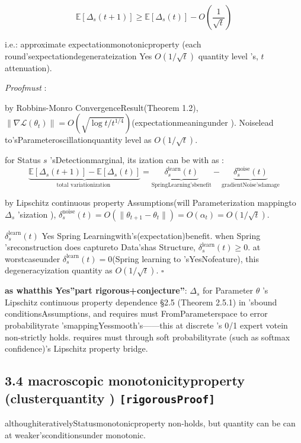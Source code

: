 \documentclass[
  12pt,
]{article}
\begin{document}
\[\boxed{\mathbb{E}[\Delta_s(t+1)] \geq \mathbb{E}[\Delta_s(t)] - O\left(\frac{1}{\sqrt{t}}\right)}\]

i.e.: approximate expectationmonotonicproperty (each round'sexpectationdegenerateization Yes \(O(1/\sqrt{t})\) quantity level 's,  \(t\)
attenuation). 

\emph{Proofmust }: 

by  Robbins-Monro ConvergenceResult(Theorem
1.2), \(\|\nabla\mathcal{L}(\theta_t)\| = O(\sqrt{\log t / t^{1/4}})\)(expectationmeaningunder ). Noiselead to'sParameteroscillationquantity level as 
\(O(1/\sqrt{t})\). 

for Status \(s\) 'sDetectionmarginal, its ization can be with as : 
\[\underbrace{\mathbb{E}[\Delta_s(t+1)] - \mathbb{E}[\Delta_s(t)]}_{\text{total variationization }} = \underbrace{\delta_s^{\text{learn}}(t)}_{\text{SpringLearning'sbenefit}} - \underbrace{\delta_s^{\text{noise}}(t)}_{\text{gradientNoise'sdamage}}\]

by  Lipschitz continuous property Assumptions(will Parameterization mappingto  \(\Delta_s\)
'sization ), \(\delta_s^{\text{noise}}(t) = O(\|\theta_{t+1} - \theta_t\|) = O(\alpha_t) = O(1/\sqrt{t})\). 

\(\delta_s^{\text{learn}}(t)\) Yes Spring Learningwith's(expectation)benefit. when 
Spring
'sreconstruction does captureto Data'shas Structure, \(\delta_s^{\text{learn}}(t) \geq 0\). at worstcaseunder 
\(\delta_s^{\text{learn}}(t) = 0\)(Spring
learning to 'sYesNofeature), this degeneracyization quantity as  \(O(1/\sqrt{t})\). \(\square\)

\textbf{as whatthis Yes''part rigorous+conjecture''}: \(\Delta_s\) for Parameter \(\theta\) 's
Lipschitz continuous property dependence §2.5 (Theorem 2.5.1)
in 'sbound conditionsAssumptions, and requires must FromParameterspace to error probabilityrate 'smappingYessmooth's------this at discrete 's
0/1 expert votein non-strictly holds. requires must through soft probabilityrate (such as  softmax confidence)'s
Lipschitz property bridge. 

\subsection{\texorpdfstring{3.4 macroscopic monotonicityproperty (clusterquantity )
\texttt{{[}rigorousProof{]}}}{3.4 macroscopic monotonicityproperty (clusterquantity ) {[}rigorousProof{]}}}\label{ux5b8fux89c2ux5355ux8c03ux6027ux805aux5408ux5ea6ux91cf-ux4e25ux683cux8bc1ux660e}

althoughiterativelyStatusmonotonicproperty non-holds, but quantity can be can at weaker'sconditionsunder monotonic. 
\end{document}
